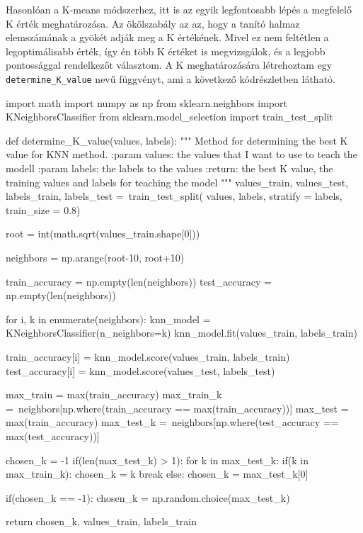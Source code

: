 Hasonlóan a K-means módszerhez, itt is az egyik legfontosabb lépés a megfelelő K érték meghatározása. Az ökölszabály az az, hogy a tanító halmaz elemszámának a gyökét adják meg a K értékének. Mivel ez nem feltétlen a legoptimálisabb érték, így én több K értéket is megvizsgálok, és a legjobb pontossággal rendelkezőt választom. A K meghatározására létrehoztam egy \texttt{determine\_K\_value} nevű függvényt, ami a következő kódrészletben látható.
\begin{python}
import math
import numpy as np
from sklearn.neighbors import KNeighborsClassifier
from sklearn.model_selection import train_test_split

def determine_K_value(values, labels):
    """
    Method for determining the best K value for KNN method.
    :param values: the values that I want to use to teach the modell
    :param labels: the labels to the values
    :return: the best K value, the training values and labels
        for teaching the model
    """
    values_train, values_test, labels_train, labels_test =\
        train_test_split(
            values,
            labels,
            stratify = labels,
            train_size = 0.8)

    root =  int(math.sqrt(values_train.shape[0]))

    neighbors = np.arange(root-10, root+10)

    train_accuracy = np.empty(len(neighbors))
    test_accuracy = np.empty(len(neighbors))

    for i, k in enumerate(neighbors):
        knn_model = KNeighborsClassifier(n_neighbors=k)
        knn_model.fit(values_train, labels_train)

        train_accuracy[i] = knn_model.score(values_train, labels_train)
        test_accuracy[i] = knn_model.score(values_test, labels_test)

    max_train = max(train_accuracy)
    max_train_k =\
        neighbors[np.where(train_accuracy == max(train_accuracy))]
    max_test = max(train_accuracy)
    max_test_k =\
        neighbors[np.where(test_accuracy == max(test_accuracy))]

    chosen_k = -1
    if(len(max_test_k) > 1):
        for k in max_test_k:
            if(k in max_train_k):
                chosen_k = k
                break
    else:
        chosen_k = max_test_k[0]

    if(chosen_k == -1):
        chosen_k = np.random.choice(max_test_k)

    return chosen_k, values_train, labels_train
\end{python}

